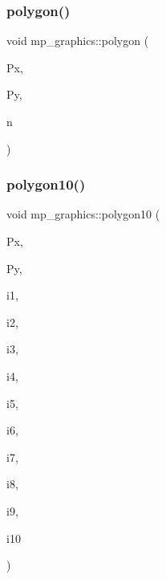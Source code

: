 \mbox{\label{classmp__graphics_af35f47d4f85518e28515878cf8fec1fc}} 
\subsubsection{\texorpdfstring{polygon()}{polygon()}}
{\footnotesize\ttfamily void mp\+\_\+graphics\+::polygon (\begin{DoxyParamCaption}\item[{\mbox{\hyperlink{galois_8h_a09fddde158a3a20bd2dcadb609de11dc}{I\+NT}} $\ast$}]{Px,  }\item[{\mbox{\hyperlink{galois_8h_a09fddde158a3a20bd2dcadb609de11dc}{I\+NT}} $\ast$}]{Py,  }\item[{\mbox{\hyperlink{galois_8h_a09fddde158a3a20bd2dcadb609de11dc}{I\+NT}}}]{n }\end{DoxyParamCaption})}

\mbox{\label{classmp__graphics_a1fec1e127a9d626b6bce4dcf9e70ed47}} 
\subsubsection{\texorpdfstring{polygon10()}{polygon10()}}
{\footnotesize\ttfamily void mp\+\_\+graphics\+::polygon10 (\begin{DoxyParamCaption}\item[{\mbox{\hyperlink{galois_8h_a09fddde158a3a20bd2dcadb609de11dc}{I\+NT}} $\ast$}]{Px,  }\item[{\mbox{\hyperlink{galois_8h_a09fddde158a3a20bd2dcadb609de11dc}{I\+NT}} $\ast$}]{Py,  }\item[{\mbox{\hyperlink{galois_8h_a09fddde158a3a20bd2dcadb609de11dc}{I\+NT}}}]{i1,  }\item[{\mbox{\hyperlink{galois_8h_a09fddde158a3a20bd2dcadb609de11dc}{I\+NT}}}]{i2,  }\item[{\mbox{\hyperlink{galois_8h_a09fddde158a3a20bd2dcadb609de11dc}{I\+NT}}}]{i3,  }\item[{\mbox{\hyperlink{galois_8h_a09fddde158a3a20bd2dcadb609de11dc}{I\+NT}}}]{i4,  }\item[{\mbox{\hyperlink{galois_8h_a09fddde158a3a20bd2dcadb609de11dc}{I\+NT}}}]{i5,  }\item[{\mbox{\hyperlink{galois_8h_a09fddde158a3a20bd2dcadb609de11dc}{I\+NT}}}]{i6,  }\item[{\mbox{\hyperlink{galois_8h_a09fddde158a3a20bd2dcadb609de11dc}{I\+NT}}}]{i7,  }\item[{\mbox{\hyperlink{galois_8h_a09fddde158a3a20bd2dcadb609de11dc}{I\+NT}}}]{i8,  }\item[{\mbox{\hyperlink{galois_8h_a09fddde158a3a20bd2dcadb609de11dc}{I\+NT}}}]{i9,  }\item[{\mbox{\hyperlink{galois_8h_a09fddde158a3a20bd2dcadb609de11dc}{I\+NT}}}]{i10 }\end{DoxyParamCaption})}

